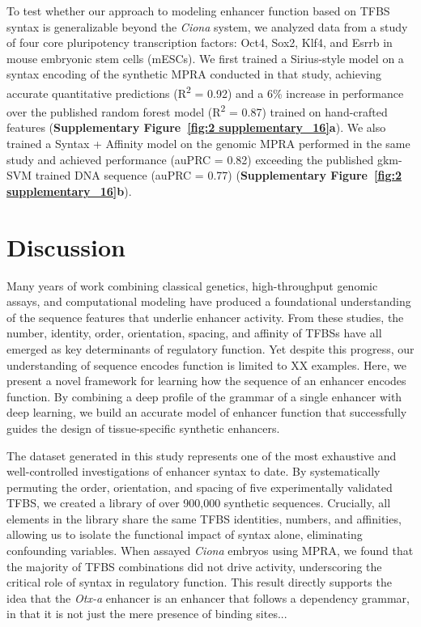 To test whether our approach to modeling enhancer function based on TFBS syntax is generalizable beyond the \textit{Ciona} system, we analyzed data from a study of four core pluripotency transcription factors: Oct4, Sox2, Klf4, and Esrrb in mouse embryonic stem cells (mESCs)\cite{King2020-hk}. We first trained a Sirius-style model on a syntax encoding of the synthetic MPRA conducted in that study, achieving accurate quantitative predictions (R\textsuperscript{2} = 0.92) and a 6\% increase in performance over the published random forest model (R\textsuperscript{2} = 0.87) trained on hand-crafted features (\textbf{Supplementary Figure~\ref{fig:2 supplementary_16}a}). We also trained a Syntax + Affinity model on the genomic MPRA performed in the same study and achieved performance (auPRC = 0.82) exceeding the published gkm-SVM trained DNA sequence (auPRC = 0.77) (\textbf{Supplementary Figure~\ref{fig:2 supplementary_16}b}).

\section{Discussion}

Many years of work combining classical genetics, high-throughput genomic assays, and computational modeling have produced a foundational understanding of the sequence features that underlie enhancer activity. From these studies, the number, identity, order, orientation, spacing, and affinity of TFBSs have all emerged as key determinants of regulatory function. Yet despite this progress, our understanding of sequence encodes function is limited to XX examples. Here, we present a novel framework for learning how the sequence of an enhancer encodes function. By combining a deep profile of the grammar of a single enhancer with deep learning, we build an accurate model of enhancer function that successfully guides the design of tissue-specific synthetic enhancers.

The dataset generated in this study represents one of the most exhaustive and well-controlled investigations of enhancer syntax to date. By systematically permuting the order, orientation, and spacing of five experimentally validated TFBS, we created a library of over 900,000 synthetic sequences. Crucially, all elements in the library share the same TFBS identities, numbers, and affinities, allowing us to isolate the functional impact of syntax alone, eliminating confounding variables. When assayed \textit{Ciona} embryos using MPRA, we found that the majority of TFBS combinations did not drive activity, underscoring the critical role of syntax in regulatory function. This result directly supports the idea that the \textit{Otx-a} enhancer is an enhancer that follows a dependency grammar\cite{Jindal2021-zk}, in that it is not just the mere presence of binding sites...

